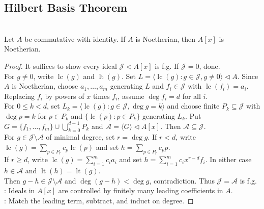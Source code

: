 \subsection{Hilbert Basis Theorem}

\begin{theorem} \label{thm:hilbert-basis-theorem} \\
Let $A$ be commutative with identity. If $A$ is Noetherian, then $A[x]$ is Noetherian.
\begin{proof}
It suffices to show every ideal $\mathcal{J}\lhd A[x]$ is f.g. If $\mathcal{J}=0$, done.\\
For $g\neq0$, write $\operatorname{lc}(g)$ and $\operatorname{lt}(g)$. Set $L=\langle\operatorname{lc}(g):g\in\mathcal{J}, g\neq0\rangle\lhd A$. Since $A$ is Noetherian, choose $a_1,\ldots,a_m$ generating $L$ and $f_i\in\mathcal{J}$ with $\operatorname{lc}(f_i)=a_i$. Replacing $f_i$ by powers of $x$ times $f_i$, assume $\deg f_i=d$ for all $i$.\\
For $0\leq k<d$, set $L_k=\langle\operatorname{lc}(g):g\in\mathcal{J}, \deg g=k\rangle$ and choose finite $P_k\subseteq\mathcal{J}$ with $\deg p=k$ for $p\in P_k$ and $\{\operatorname{lc}(p):p\in P_k\}$ generating $L_k$. Put $G=\{f_1,\ldots,f_m\}\cup\bigcup_{k=0}^{d-1}P_k$ and $\mathcal{A}=\langle G\rangle\lhd A[x]$. Then $\mathcal{A}\subseteq\mathcal{J}$.\\
For $g\in\mathcal{J}\setminus\mathcal{A}$ of minimal degree, set $r=\deg g$. If $r<d$, write $\operatorname{lc}(g)=\sum_{p\in P_r}c_p\operatorname{lc}(p)$ and set $h=\sum_{p\in P_r}c_pp$.\\
If $r\geq d$, write $\operatorname{lc}(g)=\sum_{i=1}^{m}c_ia_i$ and set $h=\sum_{i=1}^{m}c_ix^{r-d}f_i$. In either case $h\in\mathcal{A}$ and $\operatorname{lt}(h)=\operatorname{lt}(g)$.\\
Then $g-h\in\mathcal{J}\setminus\mathcal{A}$ and $\deg(g-h)<\deg g$, contradiction. Thus $\mathcal{J}=\mathcal{A}$ is f.g.\\
: Ideals in $A[x]$ are controlled by finitely many leading coefficients in $A$.\\
: Match the leading term, subtract, and induct on degree.
\end{proof}
\end{theorem}
